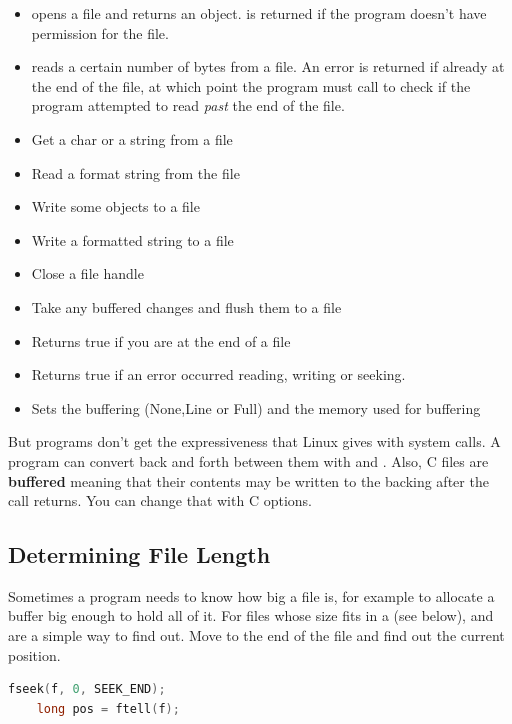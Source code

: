\begin{itemize}
	\item {} opens a file and returns an object.  is returned if the program doesn't have permission for the file.
	\item {} reads a certain number of bytes from a file. An error is returned if already at the end of the file, at which point the program must call  to check if the program attempted to read \textit{past} the end of the file.
	\item {} Get a char or a string from a file
	\item {} Read a format string from the file
	\item {} Write some objects to a file
	\item {} Write a formatted string to a file
	\item {} Close a file handle
	\item {} Take any buffered changes and flush them to a file
	\item {} Returns true if you are at the end of a file
 	\item {} Returns true if an error occurred reading, writing or seeking.
  	\item {} Sets the buffering (None,Line or Full) and the memory used for buffering
\end{itemize}
	 
But programs don't get the expressiveness that Linux gives with system calls.
A program can convert back and forth between them with  and .
Also, C files are \textbf{buffered} meaning that their contents may be written to the backing after the call returns.
You can change that with C options.
	  
\subsection{Determining File Length}
	 
Sometimes a program needs to know how big a file is, for example to allocate a buffer big enough to hold all of it.
For files whose size fits in a  (see below),  and  are a simple way to find out.
Move to the end of the file and find out the current position.
	 
\begin{lstlisting}[language=C]
	fseek(f, 0, SEEK_END);
	long pos = ftell(f);
\end{lstlisting}
	 
